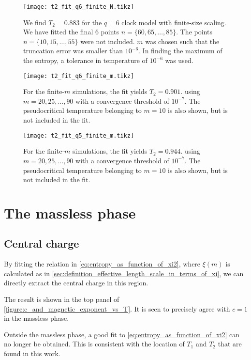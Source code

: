 \begin{figure}
  \centering
  \texttt{[image: t2\_fit\_q6\_finite\_N.tikz]}
  \caption{We find $T_2 = 0.883$ for the $q = 6$ clock model with finite-size scaling.
  We have fitted the final 6 points $n = \{ 60, 65, \dots, 85 \}$.
  The points $n = \{ 10, 15, \dots, 55 \}$ were not included.
  $m$ was chosen such that the truncation error was smaller than $10^{-6}$.
  In finding the maximum of the entropy, a tolerance in temperature of $10^{-6}$ was used.}
  \label{figure:t2_fit_q6_finite_N}
\end{figure}

\begin{figure}
  \centering
  \texttt{[image: t2\_fit\_q6\_finite\_m.tikz]}
  \caption{
  For the finite-$m$ simulations, the fit yields $T_2 = 0.901$.
  using $m = 20, 25, \dots,
  90$ with a convergence threshold of $10^{-7}$.
  The pseudocritical temperature belonging to $m = 10$ is also shown,
  but is not included in the fit.}\label{figure:t2_fit_q6_finite_m}
\end{figure}

\begin{figure}
  \centering
  \texttt{[image: t2\_fit\_q5\_finite\_m.tikz]}
  \caption{
  For the finite-$m$ simulations, the fit yields $T_2 = 0.944$.
  using $m = 20, 25, \dots,
  90$ with a convergence threshold of $10^{-7}$.
  The pseudocritical temperature belonging to $m = 10$ is also shown,
  but is not included in the fit.}\label{figure:t2_fit_q5_finite_m}
\end{figure}

\section{The massless phase}

\subsection{Central charge}\label{sec:central_charge_massless_phase}

By fitting the relation in \autoref{eq:entropy_as_function_of_xi2},
where $\xi(m)$ is calculated as in \autoref{sec:definition_effective_length_scale_in_terms_of_xi},
we can directly extract the central charge in this region.

The result is shown in the top panel of \autoref{figure:c_and_magnetic_exponent_vs_T}.
It is seen to precisely agree with $c = 1$ in the massless phase.

Outside the massless phase, a good fit to \autoref{eq:entropy_as_function_of_xi2} can no longer be obtained.
This is consistent with the location of $T_1$ and $T_2$ that are found in this work.


